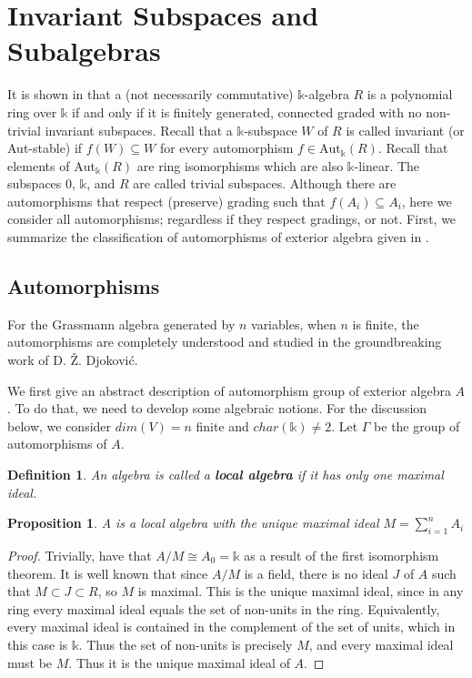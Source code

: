 \documentclass[12pt]{article}
\newtheorem{proposition}[theorem]{Proposition}
\newtheorem{definition}[theorem]{Definition}
\numberwithin{theorem}{section}
\numberwithin{equation}{theorem}
\newcommand{\kk}{\mathds{k}}
\begin{document}
\pagebreak

\section{Invariant Subspaces and Subalgebras}

It is shown in \cite{zahra} that a (not necessarily commutative) $\kk$-algebra $R$ is a polynomial ring over $\kk$ if and only if it is finitely generated, connected graded with no non-trivial invariant subspaces. Recall that a $\kk$-subspace $W$ of $R$ is called invariant (or Aut-stable) if $f(W)\subseteq W$ for every automorphism $f \in \text{Aut}_{\kk}(R)$. Recall that elements of $\text{Aut}_{\kk}(R)$ are ring isomorphisms which are also ${\kk}$-linear. The subspaces $0$, $\kk$, and $R$ are called trivial subspaces. Although there are automorphisms that respect (preserve) grading such that $f(A_i) \subseteq A_i$, here we consider all automorphisms; regardless if they respect gradings, or not. First, we summarize the classification of automorphisms of exterior algebra given in \cite{djokovic}.

\subsection{Automorphisms}

For the Grassmann algebra generated by $n$ variables, when $n$ is finite, the automorphisms are completely understood and studied in the groundbreaking work of D. {\v{Z}}. Djokovi{\'c}.

We first give an abstract description of automorphism group of exterior algebra $A$. To do that, we need to develop some algebraic notions. For the discussion below, we consider $dim(V) = n$ finite and $char(\kk) \neq 2$. Let $\Gamma$ be the group of automorphisms of $A$.

\begin{definition}
    An algebra is called a \textbf{local algebra} if it has only one maximal ideal.
\end{definition}

\begin{proposition}\label{local}
    A is a local algebra with the unique maximal ideal $M = \sum_{i=1}^n A_i$
\end{proposition}
\begin{proof}
    Trivially, have that $A/M \cong A_0 = \kk$ as a result of the first isomorphism theorem. It is well known that since $A/M$ is a field, there is no ideal $J$ of $A$ such that $M \subset J \subset R$, so $M$ is maximal. This is the unique maximal ideal, since in any ring every maximal ideal equals the set of non-units in the ring. Equivalently, every maximal ideal is contained in the complement of the set of units, which in this case is $\kk$. Thus the set of non-units is precisely $M$, and every maximal ideal must be $M$. Thus it is the unique maximal ideal of $A$.
\end{proof}
\end{document}
